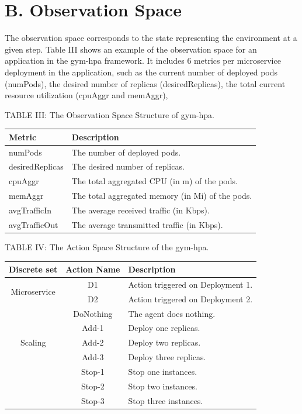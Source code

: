 \documentclass[10pt]{article}
\begin{document}
\section*{B. Observation Space}
The observation space corresponds to the state representing the environment at a given step. Table III shows an example of the observation space for an application in the gym-hpa framework. It includes 6 metrics per microservice deployment in the application, such as the current number of deployed pods (numPods), the desired number of replicas (desiredReplicas), the total current resource utilization (cpuAggr and memAggr),

TABLE III: The Observation Space Structure of gym-hpa.

\begin{center}
\begin{tabular}{|l|l|}
\hline
Metric & Description \\
\hline
numPods & The number of deployed pods. \\
\hline
desiredReplicas & The desired number of replicas. \\
\hline
cpuAggr & The total aggregated CPU (in m) of the pods. \\
\hline
memAggr & The total aggregated memory (in Mi) of the pods. \\
\hline
avgTrafficIn & The average received traffic (in Kbps). \\
\hline
avgTrafficOut & The average transmitted traffic (in Kbps). \\
\hline
\end{tabular}
\end{center}

TABLE IV: The Action Space Structure of the gym-hpa.

\begin{center}
\begin{tabular}{|c|c|l|}
\hline
Discrete set & Action Name & Description \\
\hline
\multirow{2}{*}{Microservice} & D1 & Action triggered on Deployment 1. \\
 & D2 & Action triggered on Deployment 2. \\
\hline
\multirow{5}{*}{Scaling} & DoNothing & The agent does nothing. \\
 & Add-1 & Deploy one replicas. \\
 & Add-2 & Deploy two replicas. \\
 & Add-3 & Deploy three replicas. \\
 & Stop-1 & Stop one instances. \\
 & Stop-2 & Stop two instances. \\
 & Stop-3 & Stop three instances. \\
\hline
\end{tabular}
\end{center}
\end{document}
